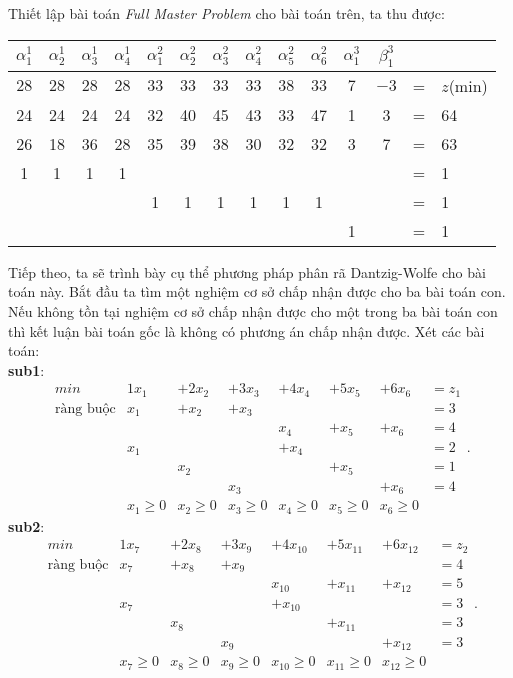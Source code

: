 Thiết lập bài toán {\it Full Master Problem} cho bài toán trên, ta thu được:
\begin{center}
\begin{tabular}{|c c c c c c c c c c c c c l|}
\hline $\alpha_1^1$ &$\alpha_2^1$ &$\alpha_3^1$ &$\alpha_4^1$ &$\alpha_1^2$ &$\alpha_2^2$ &$\alpha_3^2$ &$\alpha_4^2$ &$\alpha_5^2$ &$\alpha_6^2$ &$\alpha_1^3$ &$\beta_1^3$ & &\\
\hline $28$ &$28$ &$28$ &$28$ &$33$ &$33$ &$33$ &$33$ &$38$ &$33$ &$7$ &$-3$ & = & $z$(min)\\
\hline 24 & 24 &24 & 24 &32 &40 &45 &43 &33 &47 &1 & 3 & = & 64\\
26 & 18 &36 & 28 &35 &39 &38 &30 &32 &32 &3 &7 & = & 63\\
\hline 1 & 1 & 1 & 1 & & & & & & & & & = & 1\\
& & &  & 1 & 1 & 1 & 1 & 1 & 1 & & & = & 1\\
& & & & & & & & & & 1 & & = & 1\\
\hline
\end{tabular}
\end{center}
Tiếp theo, ta sẽ trình bày cụ thể phương pháp phân rã Dantzig-Wolfe cho bài toán này. 
Bắt đầu ta tìm một nghiệm cơ sở chấp nhận được cho ba bài toán con. Nếu không tồn tại nghiệm cơ sở chấp nhận được cho một trong ba bài toán con thì kết luận bài toán gốc là không có phương án chấp nhận được.
Xét các bài toán:\\
{\bf sub1}:
\begin{equation}\label{PT1013}
\begin{array}{llllllll}
min&1x_1&+2x_2&+3x_3&+4x_4&+5x_5&+6x_6&=z_1\\
\textrm{ràng buộc}&x_1&+x_2&+x_3&&&&=3\\
&&&&x_4&+x_5&+x_6&=4\\
&x_1&&&+x_4&&&=2\\
&&x_2&&&+x_5&&=1\\
&&&x_3&&&+x_6&=4\\
&x_1\geq0&x_2\geq0&x_3\geq0&x_4\geq0&x_5\geq0&x_6\geq0
\end{array}.
\end{equation}
{\bf sub2}:
\begin{equation}\label{PT1014}
\begin{array}{llllllll}
min&1x_7&+2x_8&+3x_9&+4x_{10}&+5x_{11}&+6x_{12}&=z_2\\
\textrm{ràng buộc}&x_7&+x_8&+x_9&&&&=4\\
&&&&x_{10}&+x_{11}&+x_{12}&=5\\
&x_7&&&+x_{10}&&&=3\\
&&x_8&&&+x_{11}&&=3\\
&&&x_9&&&+x_{12}&=3\\
&x_7\geq0&x_8\geq0&x_9\geq0&x_{10}\geq0&x_{11}\geq0&x_{12}\geq0
\end{array}.
\end{equation}
